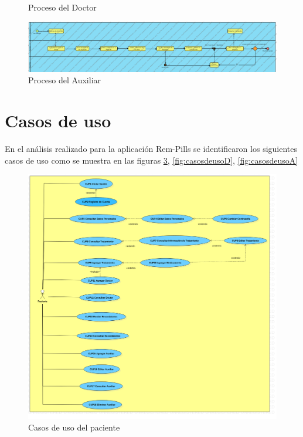 \begin{landscape}
\begin{figure}[htb]
	\caption{Proceso del Doctor} \label{fig:proceso3}
\end{figure}
\newpage
\begin{figure}[htb]
	\centering
	\includegraphics[width=1.5\textwidth]{images/cap2/ProcesosAuxiliar}
	\caption{Proceso del Auxiliar} \label{fig:proceso4}
\end{figure}

\end{landscape}



\section{Casos de uso}
En el análisis realizado para la aplicación Rem-Pills se identificaron los siguientes casos de uso como se muestra en las figuras \ref{fig:casosdeuso}, \ref{fig:casosdeusoD}, \ref{fig:casosdeusoA}\\

\begin{figure}[htb]
	\centering
	\includegraphics[width=1.1\textwidth]{images/cap2/DCUPaciente2}
	\caption{Casos de uso del paciente} \label{fig:casosdeuso}
\end{figure}


